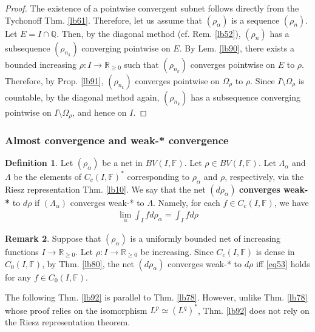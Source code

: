 \documentclass[12pt,b5paper,notitlepage]{article}
\theoremstyle{definition}
\newtheorem{df}{Definition}[subsection]
\newtheorem{rem}[df]{Remark}
\theoremstyle{plain}
\newcommand{\Qbb}{\mathbb Q}
\newcommand{\Rbb}{\mathbb R}
\newcommand{\Fbb}{\mathbb F}
\numberwithin{equation}{section}
\begin{document}
\begin{proof}
The existence of a pointwise convergent subnet follows directly from the Tychonoff Thm. \ref{lb61}. Therefore, let us assume that $(\rho_\alpha)$ is a sequence $(\rho_n)$. Let $E=I\cap\Qbb$. Then, by the diagonal method (cf. Rem. \ref{lb52}), $(\rho_n)$ has a subsequence $(\rho_{n_k})$ converging pointwise on $E$. By Lem. \ref{lb90}, there exists a bounded increasing $\rho:I\rightarrow\Rbb_{\geq0}$ such that $(\rho_{n_k})$ converges pointwise on $E$ to $\rho$. Therefore, by Prop. \ref{lb91}, $(\rho_{n_k})$ converges pointwise on $\Omega_\rho$ to $\rho$. Since $I\setminus\Omega_\rho$ is countable, by the diagonal method again, $(\rho_{n_k})$ has a subsequence converging pointwise on $I\setminus\Omega_\rho$, and hence on $I$. 
\end{proof}



\subsubsection{Almost convergence and weak-* convergence}

\begin{df}
Let $(\rho_\alpha)$ be a net in $BV(I,\Fbb)$. Let $\rho\in BV(I,\Fbb)$. Let $\Lambda_\alpha$ and $\Lambda$ be the elements of $C_c(I,\Fbb)^*$ corresponding to $\rho_\alpha$ and $\rho$, respectively, via the Riesz representation Thm. \ref{lb10}.  We say that the net $(d\rho_\alpha)$ \textbf{converges weak-*}  to $d\rho$ if $(\Lambda_\alpha)$ converges weak-* to $\Lambda$. Namely, for each $f\in C_c(I,\Fbb)$, we have
\begin{align}\label{eq53}
\lim_\alpha \int_I f d\rho_\alpha=\int_I fd\rho
\end{align}
\end{df}

\begin{rem}\label{lb186}
Suppose that $(\rho_\alpha)$ is a uniformly bounded net of increasing functions $I\rightarrow\Rbb_{\geq0}$. Let $\rho:I\rightarrow\Rbb_{\geq0}$ be increasing.  Since $C_c(I,\Fbb)$ is dense in $C_0(I,\Fbb)$, by Thm. \ref{lb80}, the net $(d\rho_\alpha)$ converges weak-* to $d\rho$ iff \eqref{eq53} holds for any $f\in C_0(I,\Fbb)$.
\end{rem}

The following Thm. \ref{lb92} is parallel to Thm. \ref{lb78}. However, unlike Thm. \ref{lb78} whose proof relies on the isomorphism $L^p\simeq(L^q)^*$, Thm. \ref{lb92} does not rely on the Riesz representation theorem.
\end{document}
